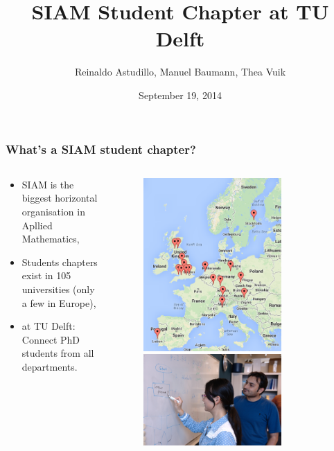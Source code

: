 \documentclass{beamer}
\title{\huge{SIAM Student Chapter at TU Delft}}
\author{Reinaldo Astudillo, Manuel Baumann, Thea Vuik}
\date{\footnotesize{September 19, 2014}}
\begin{document}
\frame{\titlepage}
\begin{frame}
\frametitle{What's a SIAM student chapter?}
\begin{columns}
 \begin{column}{0.7\textwidth}
 \begin{itemize}
  \item SIAM is the biggest horizontal organisation in Apllied Mathematics,
  \item Students chapters exist in 105 universities (only a few in Europe),
  \item at TU Delft: Connect PhD students from all departments.
 \end{itemize}

 \end{column}

 \begin{column}{0.4\textwidth}
  \begin{figure}[t]
  \centering
  \includegraphics[width=0.75\textwidth]{images/map} \vspace{0.6cm}\\
  \includegraphics[width=0.75\textwidth]{images/whiteboard1}
  \end{figure}
 \end{column}
 \end{columns}
\end{frame}
\end{document}
